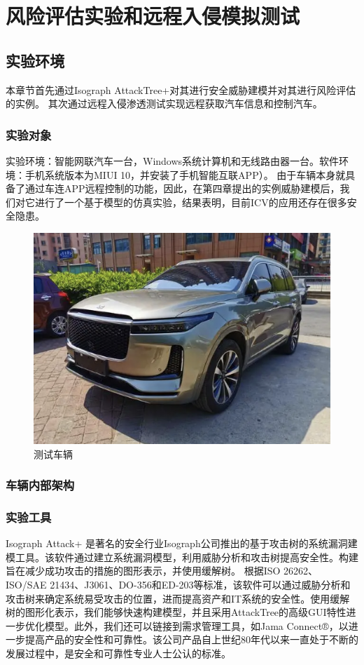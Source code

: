 \chapter{风险评估实验和远程入侵模拟测试}
\label{ch5}
\section{实验环境}
本章节首先通过Isograph AttackTree+对其进行安全威胁建模并对其进行风险评估的实例。
其次通过远程入侵渗透测试实现远程获取汽车信息和控制汽车。
\subsection{实验对象}
实验环境：智能网联汽车一台，Windows系统计算机和无线路由器一台。软件环境：手机系统版本为MIUI 10，并安装了手机智能互联APP）。
由于车辆本身就具备了通过车连APP远程控制的功能，因此，在第四章提出的实例威胁建模后，我们对它进行了一个基于模型的仿真实验，结果表明，目前ICV的应用还存在很多安全隐患。

\begin{figure}
    \centering
    \includegraphics[scale=0.5]{resources/img/i14.png}
    \caption{测试车辆}
  \end{figure}
\subsection{车辆内部架构}
\subsection{实验工具}  

Isograph Attack+ 是著名的安全行业Isograph公司推出的基于攻击树的系统漏洞建模工具。该软件通过建立系统漏洞模型，利用威胁分析和攻击树提高安全性。构建旨在减少成功攻击的措施的图形表示，并使用缓解树。
根据ISO 26262、ISO/SAE 21434、J3061、DO-356和ED-203等标准，该软件可以通过威胁分析和攻击树来确定系统易受攻击的位置，进而提高资产和IT系统的安全性。使用缓解树的图形化表示，我们能够快速构建模型，并且采用AttackTree的高级GUI特性进一步优化模型。此外，我们还可以链接到需求管理工具，如Jama Connect®，以进一步提高产品的安全性和可靠性。该公司产品自上世纪80年代以来一直处于不断的发展过程中，是安全和可靠性专业人士公认的标准。


